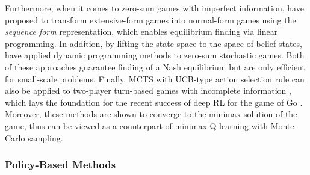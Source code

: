  Furthermore, when it comes to zero-sum games  with imperfect information, \cite{kollery1994fast, von1996efficient, koller1996efficient, von2002computing} have proposed to transform  extensive-form games into normal-form games using the 
 \textit{sequence form} representation, which enables equilibrium  finding via linear programming. 
 In addition,   by lifting the state space to  the space of belief states,  \cite{parr1995approximating,rodriguez2000reinforcement,hauskrecht2000value, hansen2004dynamic,buter2012dynamic} have applied dynamic programming methods to zero-sum stochastic games. 
 Both of these approaches  guarantee  finding of a Nash equilibrium but are only efficient for small-scale problems. 
 Finally,  MCTS with UCB-type action selection rule  \cite{chang2005adaptive,kocsis2006bandit,coulom2006efficient} can also be applied to two-player turn-based games with incomplete  information \cite{kocsis2006bandit, cowling2012information, teraoka2014efficient,whitehouse2014monte,  kaufmann2017monte}, which lays the foundation for the recent success of deep RL for the game of Go \cite{silver2016mastering}. Moreover, these methods are 
 shown to converge to the minimax solution of the game, thus can be viewed as a counterpart of minimax-Q learning with Monte-Carlo sampling. 

  
 

    
  \subsubsection{Policy-Based Methods} \label{sec:policy_comp}
 

